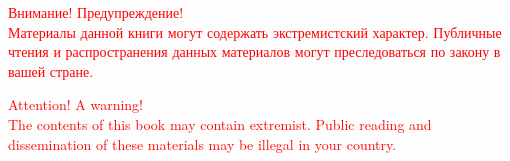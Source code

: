 \pagecolor{black}
\vspace*{\fill}
\begin{center}
\textcolor{red}{Внимание! Предупреждение!\\
Материалы данной книги могут содержать экстремистский характер. 
Публичные чтения и распространения данных материалов могут преследоваться по закону в вашей стране.}\\
\vspace*{2cm}

\textcolor{red}{Attention! A warning!\\
The contents of this book may contain extremist.
Public reading and dissemination of these materials may be illegal in your country.}
\end{center}
\vspace*{\fill}
